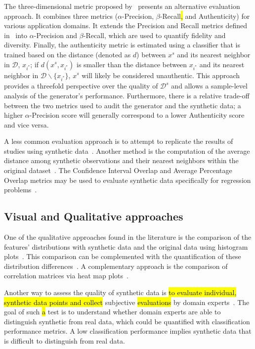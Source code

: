 The three-dimensional metric proposed by~\cite{alaa2022faithful} presents an
alternative evaluation approach. It combines three metrics
($\alpha$-Precision, $\beta$-Recall\hl{,} and Authenticity) for various application
domains. It extends the Precision and Recall metrics defined
in~\cite{sajjadi2018assessing} into $\alpha$-Precision and $\beta$-Recall,
which are used to quantify fidelity and diversity. Finally, the authenticity
metric is estimated using a classifier that is trained based on the distance
(denoted as $d$) between $x^s$ and its nearest neighbor in $\mathcal{D}$,
$x_{i^*}$; if $d(x^s, x_{i^*})$ is smaller than the distance between $x_{i^*}$
and its nearest neighbor in $\mathcal{D}\backslash \{x_{i^*}\}$, $x^s$ will
likely be considered unauthentic. This approach provides a threefold
perspective over the quality of $\mathcal{D}^s$ and allows a sample-level
analysis of the generator's performance. Furthermore, there is a relative
trade-off between the two metrics used to audit the generator and the
synthetic data; a higher $\alpha$-Precision score will generally correspond to
a lower Authenticity score and vice versa.

A less common evaluation approach is to attempt to replicate the results of
studies using synthetic data~\cite{el2020seven, benaim2020analyzing,
rosenblatt2022epistemic}. Another method is the computation of the
average distance among synthetic observations and their nearest neighbors
within the original dataset~\cite{hittmeir2019utility}. The Confidence
Interval Overlap and Average Percentage Overlap metrics may be used to
evaluate synthetic data specifically for regression
problems~\cite{khan2022utility, karr2006framework}.

\subsection{Visual and Qualitative approaches}

One of the qualitative approaches found in the literature is the comparison of
the features' distributions with synthetic data and the original data using
histogram plots~\cite{hittmeir2019utility}. This comparison can be
complemented with the quantification of these distribution
differences~\cite{el2020seven}. A complementary approach is the comparison of
correlation matrices via heat map plots~\cite{hittmeir2019utility}.

Another way to assess the quality of synthetic data is \hl{to evaluate
individual, synthetic data points and collect} subjective
\hl{evaluations} by domain experts~\cite{el2020seven}. The goal of such \hl{a} test is to
understand whether domain experts are able to distinguish synthetic from real
data, which could be quantified with classification performance metrics. A low
classification performance implies synthetic data that is difficult to
distinguish from real data.
